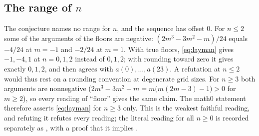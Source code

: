 \documentclass[11pt]{amsart}
\theoremstyle{plain}
\theoremstyle{definition}
\begin{document}
\subsection*{\texorpdfstring{The range of $n$}{The range of n}}
The conjecture names no range for $n$, and the sequence has offset $0$. For $n\le2$ some of the arguments of the floors are negative: $(2m^3-3m^2-m)/24$ equals $-4/24$ at $m=-1$ and $-2/24$ at $m=1$. With true floors, \eqref{eq:layman} gives $-1,-4,1$ at $n=0,1,2$ instead of $0,1,2$; with rounding toward zero it gives exactly $0,1,2$, and then agrees with $a(0),\dots,a(23)$. A refutation at $n\le2$ would thus rest on a rounding convention at degenerate grid sizes. For $n\ge3$ both arguments are nonnegative ($2m^3-3m^2-m=m\bigl(m(2m-3)-1\bigr)>0$ for $m\ge2$), so every reading of ``floor'' gives the same claim. The math0 statement therefore asserts \eqref{eq:layman} for $n\ge3$ only. This is the weakest faithful reading, and refuting it refutes every reading; the literal reading for all $n\ge0$ is recorded separately as , with a proof that it implies .
\end{document}

